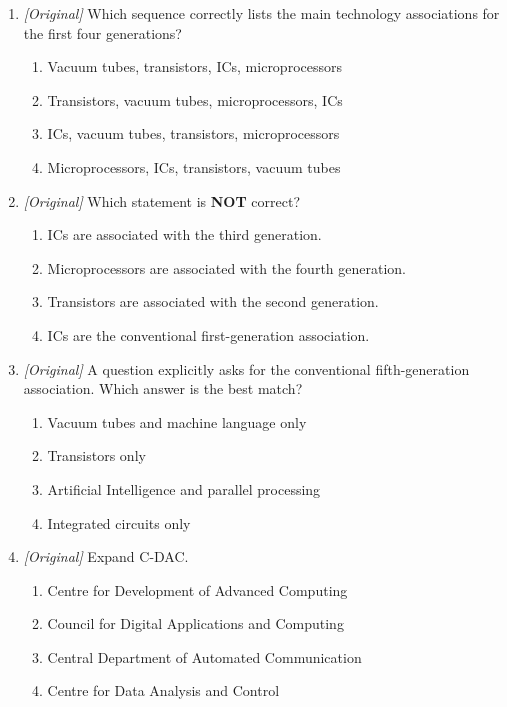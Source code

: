 \documentclass[11pt]{article}
\begin{document}
\begin{enumerate}[label=\textbf{Q\arabic*.}, leftmargin=*]
\begin{enumerate}[label=\Alph*.]
  \end{enumerate}
\item \textit{[Original]} Which sequence correctly lists the main
  technology associations for the first four generations?
  \begin{enumerate}[label=\Alph*.]
    \item Vacuum tubes, transistors, ICs, microprocessors
    \item Transistors, vacuum tubes, microprocessors, ICs
    \item ICs, vacuum tubes, transistors, microprocessors
    \item Microprocessors, ICs, transistors, vacuum tubes
  \end{enumerate}
\item \textit{[Original]} Which statement is \textbf{NOT} correct?
  \begin{enumerate}[label=\Alph*.]
    \item ICs are associated with the third generation.
    \item Microprocessors are associated with the fourth generation.
    \item Transistors are associated with the second generation.
    \item ICs are the conventional first-generation association.
  \end{enumerate}
\item \textit{[Original]} A question explicitly asks for the conventional
  fifth-generation association. Which answer is the best match?
  \begin{enumerate}[label=\Alph*.]
    \item Vacuum tubes and machine language only
    \item Transistors only
    \item Artificial Intelligence and parallel processing
    \item Integrated circuits only
  \end{enumerate}
\item \textit{[Original]} Expand C-DAC.
  \begin{enumerate}[label=\Alph*.]
    \item Centre for Development of Advanced Computing
    \item Council for Digital Applications and Computing
    \item Central Department of Automated Communication
    \item Centre for Data Analysis and Control
  \end{enumerate}

\end{enumerate}
\end{document}
